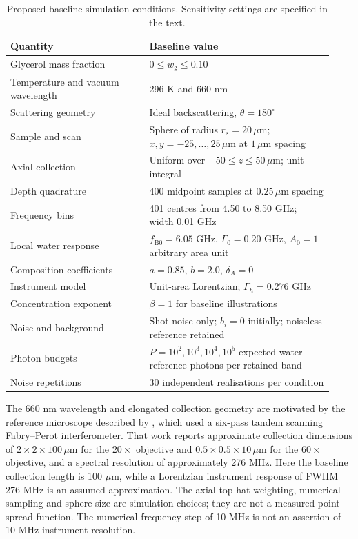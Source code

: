 \documentclass[11pt]{article}
\newcommand{\wg}{w_{\mathrm g}}
\begin{document}
\begin{table}[htbp]\centering\small
\caption{Proposed baseline simulation conditions. Sensitivity settings are specified in the text.}
\label{tab:conditions}
\begin{tabular}{@{}p{0.40\linewidth}p{0.53\linewidth}@{}}\toprule
Quantity & Baseline value \\ \midrule
Glycerol mass fraction & $0\leq\wg\leq0.10$ \\
Temperature and vacuum wavelength & 296 K and 660 nm \\
Scattering geometry & Ideal backscattering, $\theta=180^\circ$ \\
Sample and scan & Sphere of radius $r_s=20\,\mu\mathrm m$; $x,y=-25,\ldots,25\,\mu\mathrm m$ at $1\,\mu\mathrm m$ spacing \\
Axial collection & Uniform over $-50\leq z\leq50\,\mu\mathrm m$; unit integral \\
Depth quadrature & 400 midpoint samples at $0.25\,\mu\mathrm m$ spacing \\
Frequency bins & 401 centres from 4.50 to 8.50 GHz; width 0.01 GHz \\
Local water response & $f_{\mathrm B0}=6.05$ GHz, $\Gamma_0=0.20$ GHz, $A_0=1$ arbitrary area unit \\
Composition coefficients & $a=0.85$, $b=2.0$, $\delta_A=0$ \\
Instrument model & Unit-area Lorentzian; $\Gamma_h=0.276$ GHz \\
Concentration exponent & $\beta=1$ for baseline illustrations \\
Noise and background & Shot noise only; $b_i=0$ initially; noiseless reference retained \\
Photon budgets & $P=10^2,10^3,10^4,10^5$ expected water-reference photons per retained band \\
Noise repetitions & 30 independent realisations per condition \\
\bottomrule\end{tabular}\normalsize
\end{table}

The 660 nm wavelength and elongated collection geometry are motivated by the reference microscope described by \citet{mahmodi2024}, which used a six-pass tandem scanning Fabry--Perot interferometer. That work reports approximate collection dimensions of $2\times2\times100\,\mu\mathrm m$ for the $20\times$ objective and $0.5\times0.5\times10\,\mu\mathrm m$ for the $60\times$ objective, and a spectral resolution of approximately 276 MHz. Here the baseline collection length is 100 $\mu\mathrm m$, while a Lorentzian instrument response of FWHM 276 MHz is an assumed approximation. The axial top-hat weighting, numerical sampling and sphere size are simulation choices; they are not a measured point-spread function. The numerical frequency step of 10 MHz is not an assertion of 10 MHz instrument resolution.
\end{document}

